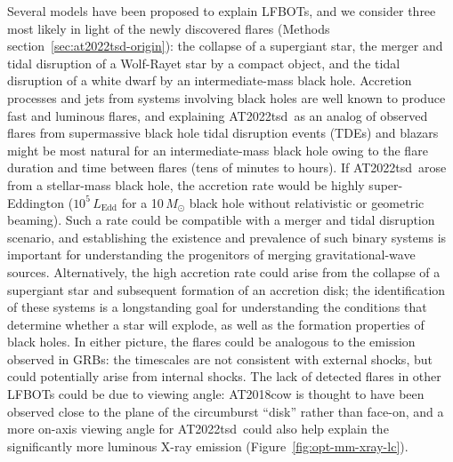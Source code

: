 \documentclass{nature_plusfigure}
\newcommand{\at}{AT2022tsd}
\begin{document}
Several models have been proposed to explain LFBOTs\cite{Metzger2022}, and we consider three most likely in light of the newly discovered flares (Methods section~\ref{sec:at2022tsd-origin}): the collapse of a supergiant star\cite{Perley2019,Margutti2019,Quataert2019}, the merger and tidal disruption of a Wolf-Rayet star by a compact object\cite{Metzger2022}, and the tidal disruption of a white dwarf by an intermediate-mass black hole\cite{Kuin2019,Perley2019}.
Accretion processes and jets from systems involving black holes are well known to produce fast and luminous flares,
and explaining \at\ as an analog of observed flares from supermassive black hole tidal disruption events (TDEs) and blazars might be most natural for an intermediate-mass black hole owing to the flare duration and time between flares (tens of minutes to hours).
If \at\ arose from a stellar-mass black hole, the accretion rate would be highly super-Eddington ($10^{5}\,L_\mathrm{Edd}$ for a 10\,$M_\odot$ black hole without relativistic or geometric beaming). Such a rate could be compatible with a merger and tidal disruption scenario\cite{Metzger2022}, and establishing the existence and prevalence of such binary systems is important for understanding the progenitors of merging gravitational-wave sources.
Alternatively, the high accretion rate could arise from the collapse of a supergiant star\cite{Quataert2019} and subsequent formation of an accretion disk; the identification of these systems is a longstanding goal for understanding the conditions that determine whether a star will explode, as well as the formation properties of black holes.
In either picture, the flares could be analogous to the emission observed in GRBs: the timescales are not consistent with external shocks, but could potentially arise from internal shocks.
The lack of detected flares in other LFBOTs could be due to viewing angle: AT2018cow is thought to have been observed close to the plane of the circumburst ``disk'' rather than face-on\cite{Margutti2019,Chen2023b}, and a more on-axis viewing angle for \at\ could also help explain the significantly more luminous X-ray emission (Figure~\ref{fig:opt-mm-xray-lc}).


%
%
\end{document}
